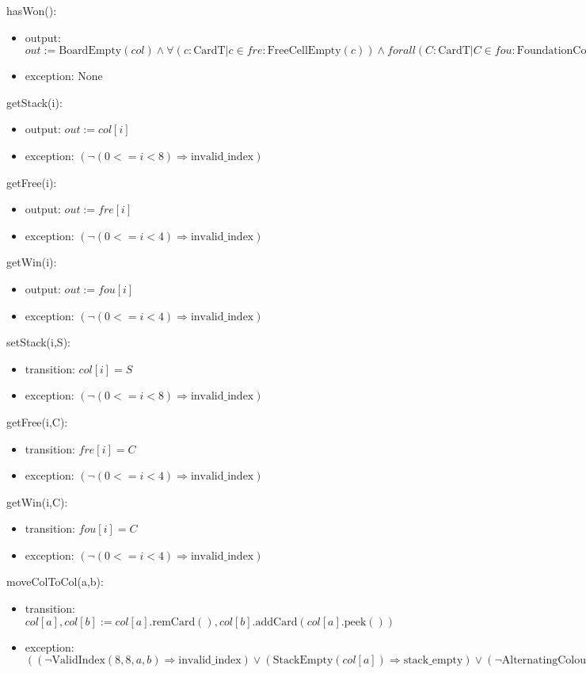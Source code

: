 \documentclass[12pt]{article}
\newcommand{\means}{\Rightarrow}
\newcommand{\m}[1]{\mbox{#1}}
\begin{document}
\noindent hasWon():
\begin{itemize}
  \item output: $out := \m{BoardEmpty}(col) \land \forall(c:\m{CardT}|c \in fre : \m{FreeCellEmpty}(c)) \land forall(C:\m{CardT}|C \in fou : \m{FoundationComplete}(C))$
  \item exception: None
\end{itemize}

\noindent getStack(i):
\begin{itemize}
  \item output: $out := col[i]$
  \item exception: $(\lnot (0<=i<8) \means \m{invalid\_index})$
\end{itemize}

\noindent getFree(i):
\begin{itemize}
  \item output: $out := fre[i]$
  \item exception: $(\lnot (0<=i<4) \means \m{invalid\_index})$
\end{itemize}

\noindent getWin(i):
\begin{itemize}
  \item output: $out := fou[i]$
  \item exception: $(\lnot (0<=i<4) \means \m{invalid\_index})$
\end{itemize}

\noindent setStack(i,S):
\begin{itemize}
  \item transition: $col[i]=S$
  \item exception: $(\lnot (0<=i<8) \means \m{invalid\_index})$
\end{itemize}

\noindent getFree(i,C):
\begin{itemize}
  \item transition: $fre[i]=C$
  \item exception: $(\lnot (0<=i<4) \means \m{invalid\_index})$
\end{itemize}

\noindent getWin(i,C):
\begin{itemize}
  \item transition: $fou[i]=C$
  \item exception: $(\lnot (0<=i<4) \means \m{invalid\_index})$
\end{itemize}

\noindent moveColToCol(a,b):
\begin{itemize}
    \item transition: $col[a], col[b] := col[a].\m{remCard}(), col[b].\m{addCard}(col[a].\m{peek}())$
    \item exception: $((\lnot \m{ValidIndex}(8,8,a,b) \means \m{invalid\_index}) \lor (\m{StackEmpty}(col[a]) \means \m{stack\_empty}) \lor (\lnot \m{AlternatingColour}(col[a].\m{peek}(),col[b].\m{peek}()) \means \m{not\_alternating\_colour}) \lor (\lnot \m{DecreasingRank}(col[a].\m{peek}(),col[b].\m{peek}()) \means \m{not\_decreasing\_rank}))$
\end{itemize}
\end{document}
